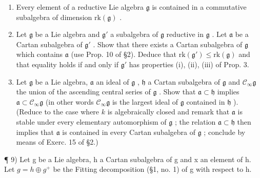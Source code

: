 \begin{enumerate}
\def\labelenumi{\arabic{enumi})}
\setcounter{enumi}{5}
\item
  Every element of a reductive Lie algebra \(\mathfrak{g}\) is contained in a commutative subalgebra of dimension \(\mathrm{rk}(\mathfrak{g})\) .
\item
  Let \(\mathfrak{g}\) be a Lie algebra and \(\mathfrak{g}'\) a subalgebra of \(\mathfrak{g}\) reductive in \(\mathfrak{g}\) . Let \(\mathfrak{a}\) be a Cartan subalgebra of \(\mathfrak{g}'\) . Show that there exists a Cartan subalgebra of \(\mathfrak{g}\) which contains \(\mathfrak{a}\) (use Prop. 10 of §2). Deduce that \(\mathrm{rk}(\mathfrak{g}') \leq \mathrm{rk}(\mathfrak{g})\) and that equality holds if and only if \(\mathfrak{g}'\) has properties (i), (ii), (iii) of Prop. 3.
\item
  Let \(\mathfrak{g}\) be a Lie algebra, \(\mathfrak{a}\) an ideal of \(\mathfrak{g}\) , \(\mathfrak{h}\) a Cartan subalgebra of \(\mathfrak{g}\) and \(\mathcal{C}_{\infty}\mathfrak{g}\) the union of the ascending central series of \(\mathfrak{g}\) . Show that \(\mathfrak{a} \subset \mathfrak{h}\) implies \(\mathfrak{a} \subset \mathcal{C}_{\infty}\mathfrak{g}\) (in other words \(\mathcal{C}_{\infty}\mathfrak{g}\) is the largest ideal of \(\mathfrak{g}\) contained in \(\mathfrak{h}\) ). (Reduce to the case where \(k\) is algebraically closed and remark that \(\mathfrak{a}\) is stable under every elementary automorphism of \(\mathfrak{g}\) ; the relation \(\mathfrak{a} \subset \mathfrak{h}\) then implies that \(\mathfrak{a}\) is contained in every Cartan subalgebra of \(\mathfrak{g}\) ; conclude by means of Exerc. 15 of §2.)
\end{enumerate}

¶ 9) Let g be a Lie algebra, h a Cartan subalgebra of g and x an element of h. Let \(g = h \oplus g^{+}\) be the Fitting decomposition (§1, no. 1) of g with respect to h.

